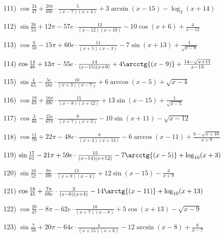 \documentclass[11pt,ukrainian]{article}
\begin{document}
111) \space 
{ ${\cos\frac{24}{47}} + \frac{28{\pi}}{69 e}\cdot {\frac{5}{(x - 7)(x + 4)}} + {3\arcsin{(x - 15)}} - {\log_{3}(x + 14)}$}
\smallskip\par
112) \space 
{ ${\sin\frac{26}{53}} + 12{\pi} - 57 e\cdot {\frac{13}{(x - 12)(x + 10)}} - {10\cos{(x + 6)}} + { \frac{4}{x - 12}}$}
\smallskip\par
113) \space 
{ ${\cos\frac{6}{50}} - 15{\pi} + 60 e\cdot {\frac{11}{(x + 5)(x - 3)}} - {7\sin{(x + 13)}} + {\frac{1}{\sqrt{x - 8}}}$}
\smallskip\par
114) \space 
{ ${\cos\frac{14}{46}} + 13{\pi} - 55 e\cdot {\frac{14}{(x - 15)(x + 9)}} + {4\arcctg{(x - 9)}} + {\frac{14 - \sqrt{x + 11}}{x - 13}}$}
\smallskip\par
115) \space 
{ ${\sin\frac{4}{65}} - \frac{5 e}{58{\pi}}\cdot {\frac{10}{(x + 3)(x - 7)}} + {6\arccos{(x - 5)}} + {\sqrt{x - 4}}$}
\smallskip\par
116) \space 
{ ${\cos\frac{19}{63}} + \frac{16{\pi}}{68 e}\cdot {\frac{15}{(x - 8)(x + 12)}} + {13\sin{(x - 15)}} + {\frac{1}{\sqrt{x - 5}}}$}
\smallskip\par
117) \space 
{ ${\cos\frac{3}{66}} - \frac{25 e}{67{\pi}}\cdot {\frac{9}{(x + 7)(x + 3)}} - {10\sin{(x + 11)}} - {\sqrt{x - 12}}$}
\smallskip\par
118) \space 
{ ${\cos\frac{11}{70}} + 22{\pi} - 48 e\cdot {\frac{8}{(x + 4)(x + 14)}} - {6\arccos{(x - 11)}} + {\frac{6 - \sqrt{x + 10}}{x + 9}}$}
\smallskip\par
119) \space 
{ ${\sin\frac{17}{61}} - 21{\pi} + 59 e\cdot {\frac{15}{(x - 14)(x + 12)}} - {7\arcctg{(x - 5)}} + {\log_{10}(x + 3)}$}
\smallskip\par
120) \space 
{ ${\sin\frac{10}{52}} - \frac{9{\pi}}{49 e}\cdot {\frac{13}{(x + 8)(x - 4)}} + {12\sin{(x - 15)}} - { \frac{3}{x + 9}}$}
\smallskip\par
121) \space 
{ ${\cos\frac{18}{45}} + \frac{7{\pi}}{69 e}\cdot {\frac{3}{(x - 6)(x + 4)}} - {14\arctg{(x - 11)}} + {\log_{10}(x + 13)}$}
\smallskip\par
122) \space 
{ ${\cos\frac{20}{47}} - 8{\pi} - 62 e\cdot {\frac{10}{(x + 7)(x - 8)}} + {5\cos{(x + 13)}} - {\sqrt{x - 9}}$}
\smallskip\par
123) \space 
{ ${\sin\frac{7}{56}} + 20{\pi} - 64 e\cdot {\frac{4}{(x + 15)(x + 6)}} - {12\arcsin{(x - 8)}} + { \frac{8}{x - 7}}$}
\smallskip\par
\end{document}
